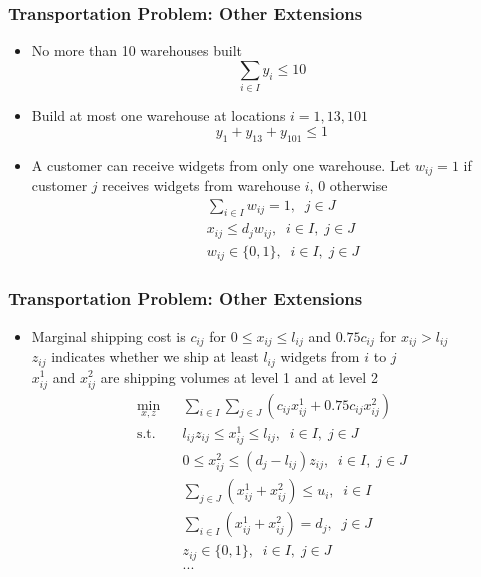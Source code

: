 \documentclass[12pt,handout]{beamer}
\begin{document}
\begin{frame}
\frametitle{Transportation Problem: Other Extensions}
\begin{itemize}
\item No more than 10 warehouses built
\begin{equation}
\sum_{i \in I} y_i \le 10 \nonumber
\end{equation}
\item Build at most one warehouse at locations $i = 1,13,101$
\begin{equation}
y_1 + y_{13} + y_{101} \le 1 \nonumber
\end{equation}
\item A customer can receive widgets from only one warehouse. Let $w_{ij} = 1$ if customer $j$ receives widgets from warehouse $i$, 0 otherwise
\begin{eqnarray}
&& \sum_{i \in I} w_{ij} = 1,\;\;j \in J \nonumber \\
&& x_{ij} \le d_j w_{ij},\;\;i \in I,\;j \in J \nonumber \\
&& w_{ij} \in \{0,1\},\;\;i \in I,\;j \in J \nonumber
\end{eqnarray}
\end{itemize}
\end{frame}

\begin{frame}
\frametitle{Transportation Problem: Other Extensions}
\begin{itemize}
\item Marginal shipping cost is $c_{ij}$ for $0 \le x_{ij} \le l_{ij}$ and $0.75c_{ij}$ for $x_{ij} > l_{ij}$ \\
$z_{ij}$ indicates whether we ship at least $l_{ij}$ widgets from $i$ to $j$ \\
$x_{ij}^1$ and $x_{ij}^2$ are shipping volumes at level 1 and at level 2
\begin{eqnarray}
\min_{x,z} && \sum_{i \in I} \sum_{j \in J} (c_{ij} x_{ij}^1 + 0.75 c_{ij} x_{ij}^2) \nonumber \\
\mbox{s.t.} && l_{ij} z_{ij} \le x_{ij}^1 \le l_{ij},\;\;i \in I,\;j \in J \nonumber \\
&& 0 \le x_{ij}^2 \le (d_j - l_{ij}) z_{ij},\;\;i \in I,\;j \in J \nonumber \\
&& \sum_{j \in J} (x_{ij}^1 + x_{ij}^2) \le u_i,\;\;i \in I \nonumber \\
&& \sum_{i \in I} (x_{ij}^1 + x_{ij}^2) = d_j,\;\;j \in J \nonumber \\
&& z_{ij} \in \{0,1\},\;\;i \in I,\;j \in J \nonumber \\
&& ... \nonumber
\end{eqnarray}
\end{itemize}
\end{frame}
\end{document}
